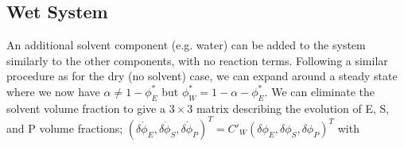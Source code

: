 \subsection{Wet System}
An additional solvent component (e.g. water) can be added to the system similarly to the other components, with no reaction terms. Following a similar procedure as for the dry (no solvent) case, we can expand around a steady state where we now have $\alpha \neq 1 - \phi^*_E$ but $\phi_W^* = 1 - \alpha - \phi^*_E$. We can eliminate the solvent volume fraction to give a $3\times3$ matrix describing the evolution of E, S, and P volume fractions; $(\dot{\delta\phi_E}, \dot{\delta\phi_S}, \dot{\delta\phi_P})^T = C'_W(\delta\phi_E, \delta\phi_S, \delta\phi_P)^T$ with
\noindent
{}

